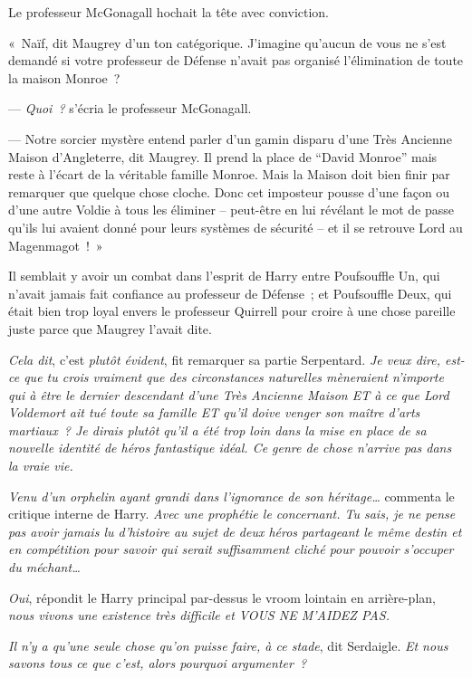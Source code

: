 Le professeur McGonagall hochait la tête avec conviction.

«~Naïf, dit Maugrey d'un ton catégorique. J'imagine qu'aucun de vous ne s'est demandé si votre professeur de Défense n'avait pas organisé l'élimination de toute la maison Monroe~?

--- \emph{Quoi~?} s'écria le professeur McGonagall.

--- Notre sorcier mystère entend parler d'un gamin disparu d'une Très Ancienne Maison d'Angleterre, dit Maugrey. Il prend la place de “David Monroe” mais reste à l'écart de la véritable famille Monroe. Mais la Maison doit bien finir par remarquer que quelque chose cloche. Donc cet imposteur pousse d'une façon ou d'une autre Voldie à tous les éliminer -- peut-être en lui révélant le mot de passe qu'ils lui avaient donné pour leurs systèmes de sécurité -- et il se retrouve Lord au Magenmagot~!~»

Il semblait y avoir un combat dans l'esprit de Harry entre Poufsouffle Un, qui n'avait jamais fait confiance au professeur de Défense~; et Poufsouffle Deux, qui était bien trop loyal envers le professeur Quirrell pour croire à une chose pareille juste parce que Maugrey l'avait dite.

\emph{Cela dit}, c'est \emph{plutôt évident}, fit remarquer sa partie Serpentard. \emph{Je veux dire, est-ce que tu crois vraiment que des circonstances naturelles mèneraient n'importe qui à être le dernier descendant d'une Très Ancienne Maison ET à ce que Lord Voldemort ait tué toute sa famille ET qu'il doive venger son maître d'arts martiaux~? Je dirais plutôt qu'il a été trop loin dans la mise en place de sa nouvelle identité de héros fantastique idéal. Ce genre de chose n'arrive pas dans la vraie vie.}

\emph{Venu d'un orphelin ayant grandi dans l'ignorance de son héritage…} commenta le critique interne de Harry. \emph{Avec une prophétie le concernant. Tu sais, je ne pense pas avoir jamais lu d'histoire au sujet de deux héros partageant le même destin et en compétition pour savoir qui serait suffisamment cliché pour pouvoir s'occuper du méchant…}

\emph{Oui}, répondit le Harry principal par-dessus le vroom lointain en arrière-plan, \emph{nous vivons une existence très difficile et VOUS NE M'AIDEZ PAS.}

\emph{Il n'y a qu'une seule chose qu'on puisse faire, à ce stade}, dit Serdaigle. \emph{Et nous savons tous ce que c'est, alors pourquoi argumenter~?}

